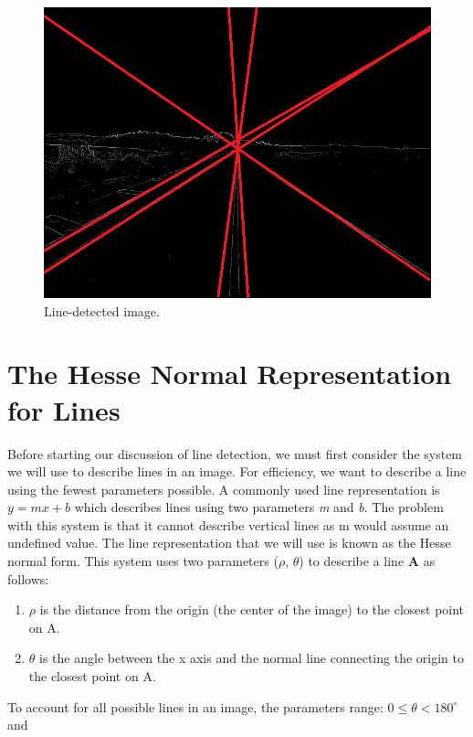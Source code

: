 \documentclass[epsfig,10pt,fullpage]{article}
\begin{document}
\begin{figure}[h]
\begin{minipage}[b]{0.32\textwidth}
	\includegraphics[width=\textwidth]{figures/fig_road_lines.png}
	\caption{Line-detected image.}
	\label{fig:road_lines}
\end{minipage}
\end{figure}




\section*{The Hesse Normal Representation for Lines}

Before starting our discussion of line detection, we must first consider the system we will use to describe lines in an image.
For efficiency, we want to describe a line using the fewest parameters possible. 
A commonly used line representation is $y = mx + b$ which describes lines using two parameters \textit{m} and \textit{b}.
The problem with this system is that it cannot describe vertical lines as m would assume an undefined value.
The line representation that we will use is known as the Hesse normal form. This system uses
two parameters ($\rho$, $\theta$) to describe a line \textbf{A} as follows:

\begin{enumerate}
\item $\rho$ is the distance from the origin (the center of the image) to the closest point on A.
\item $\theta$ is the angle between the x axis and the normal line connecting the origin to the closest point on A.
\end{enumerate}

To account for all possible lines in an image, the parameters range: $0 \leq \theta < 180^\circ$ and 
\end{document}
